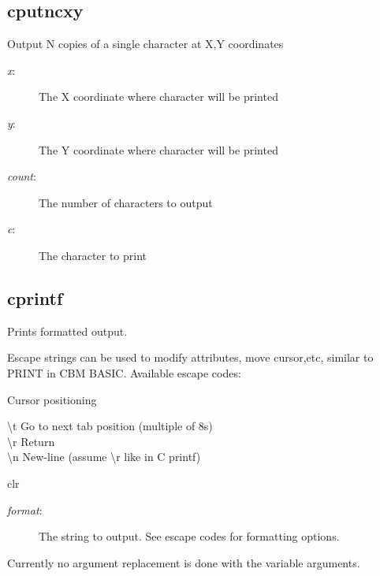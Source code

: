 \subsection{cputncxy}
\begin{description}[leftmargin=2cm,style=nextline]
\item [Description:] {Output N copies of a single character at X,Y coordinates}
\item [Syntax:] 
\item [Parameters:]
\begin{description}\item[]
\item [{\em x}:] {The X coordinate where character will be printed}
\item [{\em y}:] {The Y coordinate where character will be printed}
\item [{\em count}:] {The number of characters to output}
\item [{\em c}:] {The character to print}
\end{description}
\end{description}

\subsection{cprintf}
\begin{description}[leftmargin=2cm,style=nextline]
\item [Description:] {Prints formatted output.

    Escape strings can be used to modify attributes, move cursor,etc,
    similar to PRINT in CBM BASIC. Available escape codes:

    Cursor positioning

    \textbackslash t           Go to next tab position (multiple of 8s) \\
    \textbackslash r           Return \\
    \textbackslash n           New-line (assume \textbackslash r like in C printf)

    {clr}
}
\item [Syntax:] 
\item [Parameters:]
\begin{description}\item[]
\item [{\em format}:] {The string to output. See escape codes for formatting options.}
\end{description}
\item [Notes:] {Currently no argument replacement is done with the variable arguments.}
\end{description}

